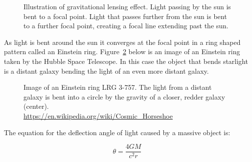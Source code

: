 \documentclass[12pt]{article} %
\begin{document}
\begin{figure}[H]
\caption{Illustration of gravitational lensing effect. Light passing by the sun is bent to a focal point. Light that passes further from the sun is bent to a further focal point, creating a focal line extending past the sun.}
\label{fig:lensing}
\end{figure}

As light is bent around the sun it converges at the focal point in a ring shaped pattern called an Einstein ring. Figure~\ref{fig:reallense} below is an image of an Einstein ring taken by the Hubble Space Telescope. In this case the object that bends starlight is a distant galaxy bending the light of an even more distant galaxy. 

\begin{figure}[H]
\caption{Image of an Einstein ring LRG 3-757. The light from a distant galaxy is bent into a circle by the gravity of a closer, redder galaxy (center).\\ \url{https://en.wikipedia.org/wiki/Cosmic_Horseshoe}}
\label{fig:reallense}
\end{figure}

The equation for the deflection angle of light caused by a massive object is:

$$\theta = \frac{4GM}{c^2r}$$
\end{document}
